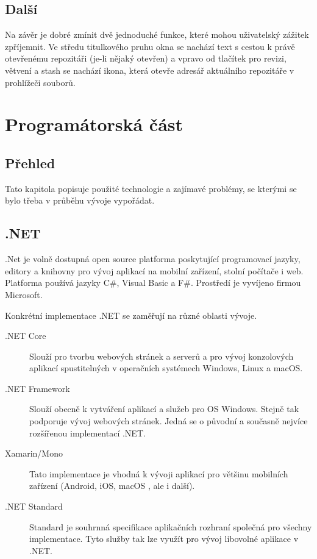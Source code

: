 \documentclass[
  biblatex,
  glossaries,
  index
]{kidiplom}
\begin{document}
\subsection{Další}
Na závěr je dobré zmínit dvě jednoduché funkce, které mohou uživatelský zážitek zpříjemnit.
Ve středu titulkového pruhu okna se nachází text s cestou k právě otevřenému repozitáři (je-li nějaký otevřen) a vpravo od tlačítek pro revizi, větvení a stash se nachází ikona, která otevře adresář aktuálního repozitáře v prohlížeči souborů.

\section{Programátorská část}

\subsection{Přehled}
Tato kapitola popisuje použité technologie a zajímavé problémy, se kterými se bylo třeba v průběhu vývoje vypořádat.

\subsection{.NET}
.Net je volně dostupná open source platforma poskytující programovací jazyky, editory a knihovny pro vývoj aplikací na mobilní zařízení, stolní počítače i web. Platforma používá jazyky C\#, Visual Basic a F\#. Prostředí je vyvíjeno firmou Microsoft.

Konkrétní implementace .NET se zaměřují na různé oblasti vývoje.

\begin{description}
\item[.NET Core] Slouží pro tvorbu webových stránek a serverů a pro vývoj konzolových aplikací spustitelných v operačních systémech Windows, Linux a macOS.

\item[.NET Framework] Slouží obecně k vytváření aplikací a služeb pro OS Windows. Stejně tak podporuje vývoj webových stránek. Jedná se o původní a současně nejvíce rozšířenou implementací .NET.

\item[Xamarin/Mono] Tato implementace je vhodná k vývoji aplikací pro většinu mobilních zařízení (Android, iOS, macOS , ale i další).

\item[.NET Standard] Standard je souhrnná specifikace aplikačních rozhraní společná pro všechny implementace. Tyto služby tak lze využít pro vývoj libovolné aplikace v .NET.
\end{description}
\end{document}
